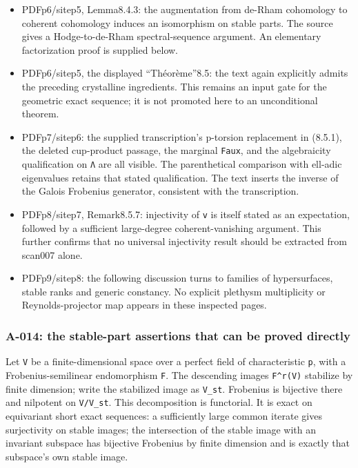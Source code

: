 \documentclass[
  10pt,
]{article}
\begin{document}
\begin{itemize}
  representations. This supplies the definition missing from the
  isolated target page.
\item
  PDFp6/sitep5, Lemma8.4.3: the augmentation from de-Rham cohomology to
  coherent cohomology induces an isomorphism on stable parts. The source
  gives a Hodge-to-de-Rham spectral-sequence argument. An elementary
  factorization proof is supplied below.
\item
  PDFp6/sitep5, the displayed ``Théorème''8.5: the text again explicitly
  admits the preceding crystalline ingredients. This remains an input
  gate for the geometric exact sequence; it is not promoted here to an
  unconditional theorem.
\item
  PDFp7/sitep6: the supplied transcription's p-torsion replacement in
  (8.5.1), the deleted cup-product passage, the marginal
  \texttt{\small Faux}, and the algebraicity qualification on
  \texttt{\small Λ} are all visible. The parenthetical comparison with
  ell-adic eigenvalues retains that stated qualification. The text
  inserts the inverse of the Galois Frobenius generator, consistent with
  the transcription.
\item
  PDFp8/sitep7, Remark8.5.7: injectivity of \texttt{\small v} is itself
  stated as an expectation, followed by a sufficient large-degree
  coherent-vanishing argument. This further confirms that no universal
  injectivity result should be extracted from scan007 alone.
\item
  PDFp9/sitep8: the following discussion turns to families of
  hypersurfaces, stable ranks and generic constancy. No explicit
  plethysm multiplicity or Reynolds-projector map appears in these
  inspected pages.
\end{itemize}

\subsubsection{A-014: the stable-part assertions that can be proved
directly}\label{a-014-the-stable-part-assertions-that-can-be-proved-directly}

Let \texttt{\small V} be a finite-dimensional space over a perfect field
of characteristic \texttt{\small p}, with a Frobenius-semilinear
endomorphism \texttt{\small F}. The descending images
\texttt{\small F\textasciicircum{}r(\allowbreak{}V)\allowbreak{}}
stabilize by finite dimension; write the stabilized image as
\texttt{\small V\_\allowbreak{}st}. Frobenius is bijective there and
nilpotent on \texttt{\small V/\allowbreak{}V\_\allowbreak{}st}. This
decomposition is functorial. It is exact on equivariant short exact
sequences: a sufficiently large common iterate gives surjectivity on
stable images; the intersection of the stable image with an invariant
subspace has bijective Frobenius by finite dimension and is exactly that
subspace's own stable image.
\end{document}
